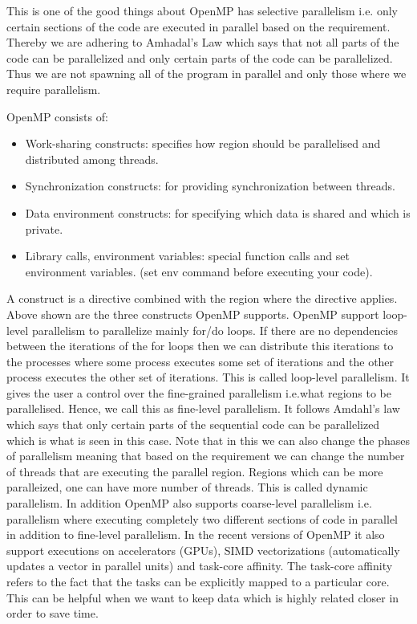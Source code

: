 \documentclass[12pt]{article}
\begin{document}
This is one of the good things about OpenMP has selective parallelism i.e. only certain sections of the code are executed in parallel based on the requirement. Thereby we are adhering to Amhadal's Law which says that not all parts of the code can be parallelized
and only certain parts of the code can be parallelized. Thus we are not spawning all of the program in parallel and only those where we require parallelism.

OpenMP consists of:
\begin{itemize}
\item Work-sharing constructs: specifies how region should be parallelised and distributed among threads.
\item Synchronization constructs: for providing synchronization between threads.
\item Data environment constructs: for specifying which data is shared and which is private.
\item Library calls, environment variables: special function calls and set environment variables. (set env command before executing your code).
\end{itemize}
A construct is a directive combined with the region where the directive applies. Above shown are the three constructs OpenMP supports.
OpenMP support loop-level parallelism to parallelize mainly for/do loops. If there are no dependencies between the iterations of the for loops then we can distribute this iterations to the processes
where some process executes some set of iterations and the other process executes the other set of iterations. This is called loop-level parallelism.
It gives the user a control over the fine-grained parallelism i.e.what regions to be parallelised. Hence, we call this as fine-level parallelism.
It follows Amdahl's law which says that only certain parts of the sequential code can be parallelized which is what is seen in this case. Note that in this we can also change the phases of parallelism meaning that 
based on the requirement we can change the number of threads that are executing the parallel region. Regions which can be more paralleized, one can have more number of threads. This is called dynamic parallelism.
In addition OpenMP also supports coarse-level parallelism i.e. parallelism where executing completely two different sections of code in parallel in addition to fine-level parallelism.
In the recent versions of OpenMP it also support executions on accelerators (GPUs), SIMD vectorizations (automatically updates a vector in parallel units) and task-core affinity.
The task-core affinity refers to the fact that the tasks can be explicitly mapped to a particular core. This can be helpful when we want to keep data which is highly related closer in order to save time.
\end{document}

